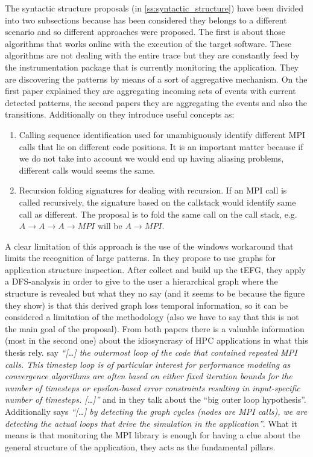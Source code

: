The syntactic structure proposals (in \ref{ss:syntactic_structure}) have been 
divided into two subsections because has been considered they belongs to a 
different scenario and so different approaches were proposed. The
first is about those algorithms that works online with the execution of the
target software. These algorithms are not dealing with the entire trace but they
are constantly feed by the instrumentation package that is currently monitoring 
the application. They are discovering the patterns by means of a sort of
aggregative mechanism. On the first paper explained they are aggregating
incoming sets of events with current detected patterns, the second papers they
are aggregating the events and also the transitions. Additionally on
\cite{noeth2009scalatrace} they introduce useful concepts as:
\begin{enumerate}[label=\roman*)]
  \item Calling sequence identification used for unambiguously identify
    different MPI calls that lie on different code positions. It is an important
    matter because if we do not take into account we would end up having aliasing
    problems, different calls would seems the same. 
  \item Recursion folding signatures for dealing with recursion. If an MPI call 
    is called recursively, the signature based on the callstack would identify
    same call as different. The proposal is to fold the same call on the call
    stack, e.g. $A\rightarrow A \rightarrow A \rightarrow MPI$ will be $A
    \rightarrow MPI$.
\end{enumerate}
A clear limitation of this approach is the use of the windows workaround
that limits the recognition of large patterns. In \cite{aguilar2016event}
they propose to use graphs for application structure inspection. After collect
and build up the tEFG, they apply a DFS-analysis in order to give to the user
a hierarchical graph where the structure is revealed but what they no say (and
it seems to be because the figure they show) is that this derived graph loss
temporal information, so it can be considered a limitation of the methodology
(also we have to say that this is not the main goal of the proposal). From both
papers there is a valuable information (most in the second one) about the
idiosyncrasy of HPC applications in what this thesis rely.
\cite{noeth2009scalatrace} say \textit{``[\ldots] the outermost loop of the code
that contained repeated MPI calls. This timestep loop is of particular interest
for performance modeling as convergence algorithms are often based on either
fixed iteration bounds for the number of timesteps or epsilon-based error 
constraints resulting in input-specific number of timesteps. [\ldots]''} and in \cite{aguilar2016event} they talk
about the ``big outer loop hypothesis''. Additionally says \textit{``[\ldots] by
detecting the graph cycles (nodes are MPI calls), we are detecting the actual
loops that drive the simulation in the application''}. What it means is that
monitoring the MPI library is enough for having a clue about the general 
structure of the application, they acts as the fundamental pillars.

